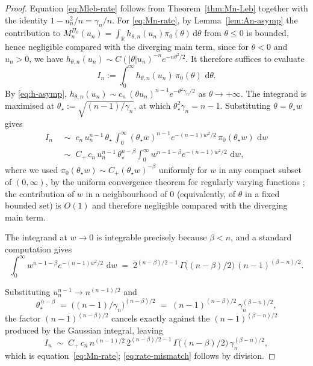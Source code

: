 \documentclass[numsec,webpdf,modern,medium,namedate]{oup-authoring-template}
\theoremstyle{thmstyleone}%
\theoremstyle{thmstyletwo}%
\theoremstyle{thmstylethree}%
\newcommand{\dd}{\,\mathrm{d}}
\newcommand{\1}{\mathbf{1}}
\begin{document}
\begin{proof}
Equation \eqref{eq:Mleb-rate} follows from Theorem~\ref{thm:Mn-Leb}
together with the identity \(1-u_n^2/n=\gamma_n/n\). For
\eqref{eq:Mn-rate}, by Lemma~\ref{lem:An-asymp} the contribution to
\(M_n^{\Pi_0}(u_n)=\int_\mathbb{R} h_{\theta,n}(u_n)\pi_0(\theta)\dd\theta\)
from \(\theta\leq 0\) is bounded, hence negligible compared with the diverging main term, since for
\(\theta<0\) and \(u_n>0\), we have
\(h_{\theta,n}(u_n)\sim C(|\theta| u_n)^{-n}e^{-n\theta^2/2}\). It
therefore suffices to evaluate
\[
   I_n:=\int_0^\infty h_{\theta,n}(u_n)\,\pi_0(\theta)\,\dd\theta.
\]
By \eqref{eq:h-asymp},
\(h_{\theta,n}(u_n)\sim c_n\,(\theta u_n)^{n-1}e^{-\theta^2\gamma_n/2}\)
as \(\theta\to+\infty\). The integrand is maximised at \(\theta_\star:=\sqrt{(n-1)/\gamma_n}\), at which
\(\theta_\star^2\gamma_n=n-1\). Substituting \(\theta=\theta_\star w\)
gives
\allowdisplaybreaks
\begin{align*}
  I_n
  &\;\sim\; c_n\,u_n^{n-1}\,\theta_\star\,
     \int_0^\infty (\theta_\star w)^{n-1}e^{-(n-1)w^2/2}\,
     \pi_0(\theta_\star w)\,\dd w\\
  &\;\sim\; C_+\,c_n\,u_n^{n-1}\,\theta_\star^{n-\beta}
     \int_0^\infty w^{n-1-\beta}e^{-(n-1)w^2/2}\,\dd w,
\end{align*}
where we used \(\pi_0(\theta_\star w)\sim C_+(\theta_\star w)^{-\beta}\) uniformly for \(w\) in any compact subset of \((0,\infty)\), by the uniform convergence theorem for regularly varying functions \cite[Thm.~1.2.1]{bingham1989regular}; the contribution of \(w\) in a neighbourhood of \(0\) (equivalently, of \(\theta\) in a
fixed bounded set) is \(O(1)\) and therefore negligible compared with the
diverging main term.

The integrand at
\(w\to 0\) is integrable precisely because \(\beta<n\), and a
standard computation gives
\[
  \int_0^\infty w^{n-1-\beta}e^{-(n-1)w^2/2}\,\dd w
  \;=\; 2^{(n-\beta)/2-1}\,\Gamma\!\bigl((n-\beta)/2\bigr)\,
        (n-1)^{(\beta-n)/2}.
\]

Substituting $u_n^{n-1} \to n^{(n-1)/2}$ and
\[
  \theta_\star^{\,n-\beta} 
  \;=\; \bigl((n-1)/\gamma_n\bigr)^{(n-\beta)/2}
  \;=\; (n-1)^{(n-\beta)/2}\, \gamma_n^{(\beta-n)/2},
\]
the factor $(n-1)^{(n-\beta)/2}$ cancels exactly against the 
$(n-1)^{(\beta-n)/2}$ produced by the Gaussian integral, leaving
\[
  I_n \;\sim\; C_+\, c_n\, n^{(n-1)/2}\, 2^{(n-\beta)/2-1}\, 
  \Gamma\!\bigl((n-\beta)/2\bigr)\, \gamma_n^{(\beta-n)/2},
\]
which is equation~\eqref{eq:Mn-rate}; \eqref{eq:rate-mismatch} follows by division.
\end{proof}
\end{document}
